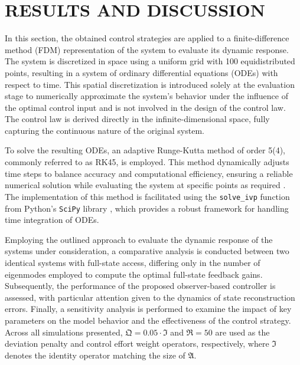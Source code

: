 \section{RESULTS AND DISCUSSION} \label{sec:results}

In this section, the obtained control strategies are applied to a finite-difference method (FDM) representation of the system to evaluate its dynamic response. The system is discretized in space using a uniform grid with 100 equidistributed points, resulting in a system of ordinary differential equations (ODEs) with respect to time. This spatial discretization is introduced solely at the evaluation stage to numerically approximate the system's behavior under the influence of the optimal control input and is not involved in the design of the control law. The control law is derived directly in the infinite-dimensional space, fully capturing the continuous nature of the original system.

To solve the resulting ODEs, an adaptive Runge-Kutta method of order 5(4), commonly referred to as RK45, is employed. This method dynamically adjusts time steps to balance accuracy and computational efficiency, ensuring a reliable numerical solution while evaluating the system at specific points as required \autocite{RK45_1, RK45_2}. The implementation of this method is facilitated using the \texttt{solve\_ivp} function from Python's \texttt{SciPy} library \autocite{2020SciPy}, which provides a robust framework for handling time integration of ODEs.

Employing the outlined approach to evaluate the dynamic response of the systems under consideration, a comparative analysis is conducted between two identical systems with full-state access, differing only in the number of eigenmodes employed to compute the optimal full-state feedback gains. Subsequently, the performance of the proposed observer-based controller is assessed, with particular attention given to the dynamics of state reconstruction errors. Finally, a sensitivity analysis is performed to examine the impact of key parameters on the model behavior and the effectiveness of the control strategy. Across all simulations presented, $\mathfrak{Q} = 0.05 \cdot \mathfrak{I}$ and $\mathfrak{R} = 50$ are used as the deviation penalty and control effort weight operators, respectively, where $\mathfrak{I}$ denotes the identity operator matching the size of $\mathfrak{A}$.

